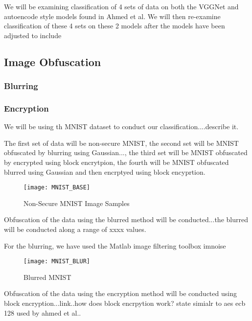 \documentclass[12pt, titlepage]{article}
\begin{document}
We will be examining classification of 4 sets of data on both the VGGNet and autoencode style models found in Ahmed et al. We will then re-examine classification of these 4 sets on these 2 models after the models have been adjusted to include 


\subsection{Image Obfuscation}
\subsubsection{Blurring}\label{BlurringMethodology}
\subsubsection{Encryption}\label{EncryptionMethodology}
We will be using th MNIST dataset to conduct our classification....describe it.

The first set of data will be non-secure MNIST, the second set will be MNIST obfuscated by blurring using Gaussian..., the third set will be MNIST obfuscated by encrypted using block encrytpion, the fourth will be MNIST obfuscated blurred using Gaussian and then encrptyed using block encyprtion. 

\begin{figure}[h!]
	\begin{center}
		\texttt{[image: MNIST\_BASE]}
		\caption{Non-Secure MNIST Image Samples}
		\label{MNIST_BASE}
	\end{center}
\end{figure}


Obfuscation of the data using the blurred method will be conducted...the blurred will be conducted along a range of xxxx values.  

 For the blurring, we have used the Matlab image filtering toolbox imnoise
 
 
 \begin{figure}[h!]
 	\begin{center}
 		\texttt{[image: MNIST\_BLUR]}
 		\caption{Blurred MNIST}
 		\label{MNIST_BLURRED}
 	\end{center}
 \end{figure}

 
 Obfuscation of the data using the encryption method will be conducted using block encryption...link..how does block encrpytion work? state simialr to aes ecb 128 used by ahmed et al..
 
\end{document}
